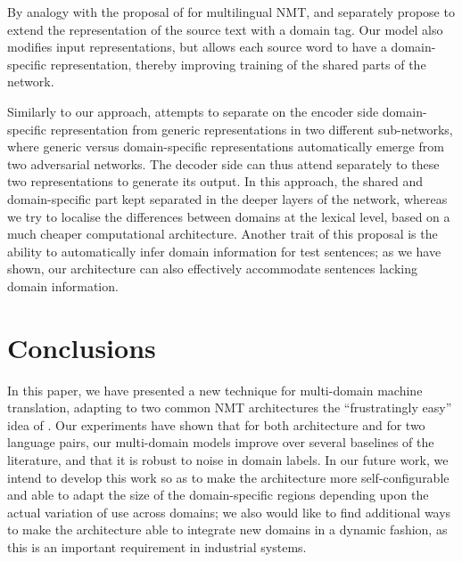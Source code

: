 \documentclass[a4paper]{article}
\newcommand{\fyDone}[1]{\done[FY]\Todo[FY:]{\textcolor{orange}{#1}}}
\begin{document}
By analogy with the proposal of \cite{Johnson17google} for multilingual NMT, \cite{Kobus17domaincontrol} and \cite{Chu18multilingual} separately propose to extend the representation of the source text with a domain tag. Our model also modifies input representations, but allows each source word to have a domain-specific representation, thereby improving training of the shared parts of the network.\fyDone{Talk about target embeddings somewhere.} 

Similarly to our approach, \cite{Zeng18multidomain} attempts to separate on the encoder side domain-specific representation from generic representations in two different sub-networks, where generic versus domain-specific representations automatically emerge from two adversarial networks. 
The decoder side can thus attend separately to these two representations to generate its output. 
In this approach, the shared and domain-specific part kept separated in the deeper layers of the network, whereas we try to localise the differences between domains at the lexical level, based on a much cheaper computational architecture. 
Another trait of this proposal is the ability to automatically infer domain information for test sentences; 
as we have shown, our architecture can also effectively accommodate sentences lacking domain information.

\section{Conclusions}
In this paper, we have presented a new technique for multi-domain machine translation, adapting to two common NMT architectures the ``frustratingly easy'' idea of \cite{Daume07frustratingly}. 
Our experiments have shown that for both architecture and for two language pairs, our multi-domain models improve over several baselines of the literature, and that it is robust to noise in domain labels. 
In our future work, we intend to develop this work so as to make the architecture more self-configurable and able to adapt the size of the domain-specific regions depending upon the actual variation of use across domains; 
we also would like to find additional ways to make the architecture able to integrate new domains in a dynamic fashion, as this is an important requirement in industrial systems.


%


\end{document}
